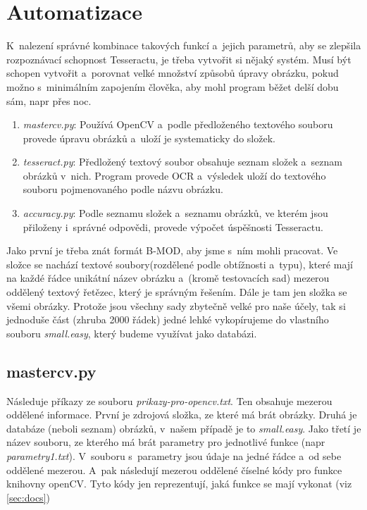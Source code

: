 \documentclass[12pt,oneside]{report}			%
\begin{document}
	\section{Automatizace}
	K~nalezení správné kombinace takových funkcí a~jejich parametrů, aby se zlepšila rozpoznávací schopnost Tesseractu, je třeba vytvořit si nějaký systém. Musí být schopen vytvořit a~porovnat velké množství způsobů úpravy obrázku, pokud možno s~minimálním zapojením člověka, aby mohl program běžet delší dobu sám, \gls{napr} přes noc.
	\begin{enumerate}
	\item{\emph{mastercv.py}: Používá OpenCV a~podle předloženého textového souboru provede úpravu obrázků a~uloží je systematicky do složek.}
	\item{\emph{tesseract.py}: Předložený textový soubor obsahuje seznam složek a~seznam obrázků v~nich. Program provede \gls{OCR} a~výsledek uloží do textového souboru pojmenovaného podle názvu obrázku. }
	\item{\emph{accuracy.py}: Podle seznamu složek a~seznamu obrázků, ve kterém jsou přiloženy i~správné odpovědi, provede výpočet úspěšnosti Tesseractu.}
	\end{enumerate}
	Jako první je třeba znát formát \gls{B-MOD}, aby jsme s~ním mohli pracovat. Ve složce se nachází textové soubory(rozdělené podle obtížnosti a~typu), které mají na každé řádce unikátní název obrázku a~(kromě testovacích sad) mezerou oddělený textový řetězec, který je správným řešením. Dále je tam jen složka se všemi obrázky. Protože jsou všechny sady zbytečně velké pro naše účely, tak si jednoduše část (zhruba 2000 řádek) jedné lehké vykopírujeme do vlastního souboru \emph{small.easy}, který budeme využívat jako databázi.
	\subsection{mastercv.py}
	Následuje příkazy ze souboru \emph{prikazy-pro-opencv.txt}. Ten obsahuje mezerou oddělené informace. První je zdrojová složka, ze které má brát obrázky. Druhá je databáze (neboli seznam) obrázků, v~našem případě je to \emph{small.easy}. Jako třetí je název souboru, ze kterého má brát parametry pro jednotlivé funkce (\gls{napr} \emph{parametry1.txt}). V~souboru s~parametry jsou údaje na jedné řádce a~od sebe oddělené mezerou. A~pak následují mezerou oddělené číselné kódy pro funkce knihovny openCV. Tyto kódy jen reprezentují, jaká funkce se mají vykonat (\gls{viz} \ref{sec:docs})
\end{document}
